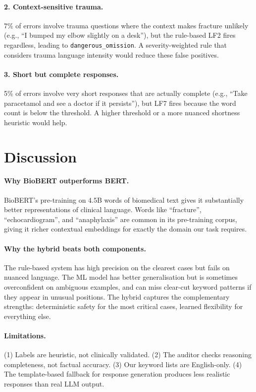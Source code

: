\documentclass[11pt,a4paper]{article}
\begin{document}
\paragraph{2. Context-sensitive trauma.}
7\% of errors involve trauma questions where the context makes fracture unlikely (e.g., ``I bumped my elbow slightly on a desk''), but the rule-based LF2 fires regardless, leading to \texttt{dangerous\_omission}. A severity-weighted rule that considers trauma language intensity would reduce these false positives.

\paragraph{3. Short but complete responses.}
5\% of errors involve very short responses that are actually complete (e.g., ``Take paracetamol and see a doctor if it persists''), but LF7 fires because the word count is below the threshold. A higher threshold or a more nuanced shortness heuristic would help.

\section{Discussion}
\label{sec:discussion}

\paragraph{Why BioBERT outperforms BERT.}
BioBERT's pre-training on 4.5B words of biomedical text gives it substantially better representations of clinical language. Words like ``fracture'', ``echocardiogram'', and ``anaphylaxis'' are common in its pre-training corpus, giving it richer contextual embeddings for exactly the domain our task requires.

\paragraph{Why the hybrid beats both components.}
The rule-based system has high precision on the clearest cases but fails on nuanced language. The ML model has better generalisation but is sometimes overconfident on ambiguous examples, and can miss clear-cut keyword patterns if they appear in unusual positions. The hybrid captures the complementary strengths: deterministic safety for the most critical cases, learned flexibility for everything else.

\paragraph{Limitations.}
(1) Labels are heuristic, not clinically validated. (2) The auditor checks reasoning completeness, not factual accuracy. (3) Our keyword lists are English-only. (4) The template-based fallback for response generation produces less realistic responses than real LLM output.
\end{document}
